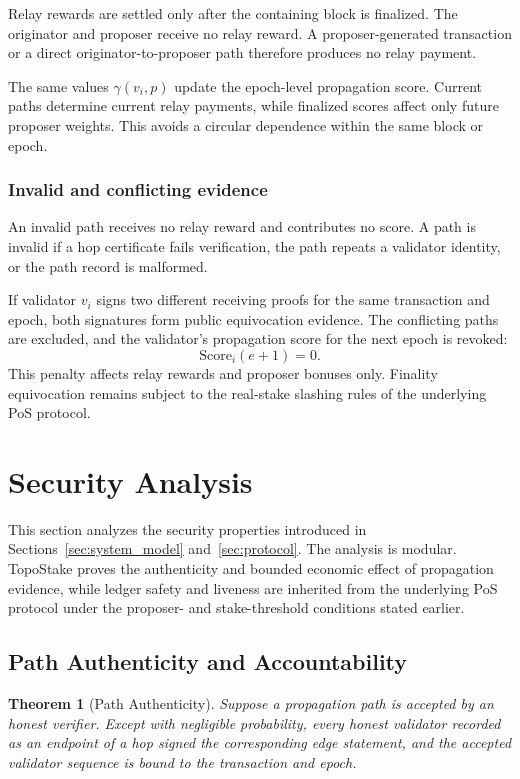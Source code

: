 \documentclass[lettersize,journal]{IEEEtran}
\newtheorem{theorem}{Theorem}
\begin{document}
Relay rewards are settled only after the containing block is finalized.
The originator and proposer receive no relay reward.
A proposer-generated transaction or a direct originator-to-proposer path therefore produces no relay payment.

The same values $\gamma(v_i,p)$ update the epoch-level propagation score.
Current paths determine current relay payments, while finalized scores affect only future proposer weights.
This avoids a circular dependence within the same block or epoch.

\subsubsection{Invalid and conflicting evidence}
An invalid path receives no relay reward and contributes no score.
A path is invalid if a hop certificate fails verification, the path repeats a validator identity, or the path record is malformed.

If validator $v_i$ signs two different receiving proofs for the same transaction and epoch, both signatures form public equivocation evidence.
The conflicting paths are excluded, and the validator's propagation score for the next epoch is revoked:
\begin{equation}
\label{eq:score_revocation}
\mathrm{Score}_i(e+1)=0.
\end{equation}
This penalty affects relay rewards and proposer bonuses only.
Finality equivocation remains subject to the real-stake slashing rules of the underlying PoS protocol.



\section{Security Analysis}
\label{sec:security}

This section analyzes the security properties introduced in Sections~\ref{sec:system_model} and~\ref{sec:protocol}.
The analysis is modular.
TopoStake proves the authenticity and bounded economic effect of propagation evidence, while ledger safety and liveness are inherited from the underlying PoS protocol under the proposer- and stake-threshold conditions stated earlier.

\subsection{Path Authenticity and Accountability}

\begin{theorem}[Path Authenticity]
\label{thm:path_authenticity}
Suppose a propagation path is accepted by an honest verifier.
Except with negligible probability, every honest validator recorded as an endpoint of a hop signed the corresponding edge statement, and the accepted validator sequence is bound to the transaction and epoch.
\end{theorem}
\end{document}
